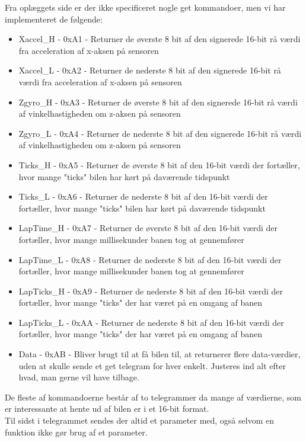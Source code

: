 Fra oplæggets side er der ikke specificeret nogle get kommandoer, men vi har implementeret de følgende:
\begin{itemize}[noitemsep,nolistsep,topsep=0ex]
	\item Xaccel\_H - 0xA1 - Returner de øverste 8 bit af den signerede 16-bit rå værdi fra acceleration af x-aksen på sensoren
	\item Xaccel\_L - 0xA2 - Returner de nederste 8 bit af den signerede 16-bit rå værdi fra acceleration af x-aksen på sensoren
	\item Zgyro\_H - 0xA3 - Returner de øverste 8 bit af den signerede 16-bit rå værdi af vinkelhastigheden om z-aksen på sensoren
	\item Zgyro\_L - 0xA4 - Returner de nederste 8 bit af den signerede 16-bit rå værdi af vinkelhastigheden om z-aksen på sensoren
	\item Ticks\_H - 0xA5 - Returner de øverste 8 bit af den 16-bit værdi der fortæller, hvor mange "ticks" bilen har kørt på daværende tidspunkt
	\item Ticks\_L - 0xA6 - Returner de nederste 8 bit af den 16-bit værdi der fortæller, hvor mange "ticks" bilen har kørt på daværende tidspunkt
	\item LapTime\_H - 0xA7 - Returner de øverste 8 bit af den 16-bit værdi der fortæller, hvor mange millisekunder banen tog at gennemfører
	\item LapTime\_L - 0xA8 - Returner de nederste 8 bit af den 16-bit værdi der fortæller, hvor mange millisekunder banen tog at gennemfører
	\item LapTicks\_H - 0xA9 - Returner de nederste 8 bit af den 16-bit værdi der fortæller, hvor mange "ticks" der har været på en omgang af banen
	\item LapTicks\_L - 0xAA - Returner de nederste 8 bit af den 16-bit værdi der fortæller, hvor mange "ticks" der har været på en omgang af banen
	\item Data - 0xAB - Bliver brugt til at få bilen til, at returnerer flere data-værdier, uden at skulle sende et get telegram for hver enkelt. Justeres ind alt efter hvad, man gerne vil have tilbage.
	
\end{itemize}

De fleste af kommandoerne består af to telegrammer da mange af værdierne, som er interessante at hente ud af bilen er i et 16-bit format.\\
Til sidst i telegrammet sendes der altid et parameter med, også selvom en funktion ikke gør brug af et parameter.

